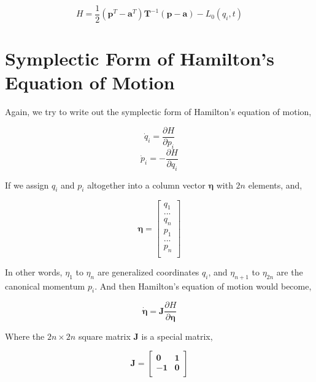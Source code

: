 \documentclass[12pt]{article}
\numberwithin{equation}{section}
\begin{document}
\begin{center}
    \[ H = \frac{1}{2}(\mathbf{p}^T - \mathbf{a}^T) \mathbf{T}^{-1} (\mathbf{p} - \mathbf{a}) - L_0(q_i, t) \]
\end{center}

\section{Symplectic Form of Hamilton's Equation of Motion}

Again, we try to write out the symplectic form of Hamilton's equation of motion,

\begin{center}
    \[ \dot{q}_i = \frac{\partial H}{\partial p_i} \]
    \[ \dot{p}_i = -\frac{\partial H}{\partial q_i}\]
\end{center}

If we assign $q_i$ and $p_i$ altogether into a column vector $\pmb{\eta}$ with $2n$ elements, and,

\begin{center}
    \[ \pmb{\eta} = \begin{bmatrix}
        q_1\\
        ...\\
        q_n\\
        p_1\\
        ...\\
        p_n\\
    \end{bmatrix}\]
\end{center}

In other words, $\eta_1$ to $\eta_n$ are generalized coordinates $q_i$, and $\eta_{n+1}$ to $\eta_{2n}$ are the canonical momentum $p_{i}$. And then Hamilton's equation of motion would become,

\begin{center}
    \[ \dot{\pmb{\eta}} = \pmb{J}\frac{\partial H}{\partial \pmb{\eta}}\]
\end{center}

Where the $2n \times 2n$ square matrix $\pmb{J}$ is a special matrix,

\begin{center}
    \[ \pmb{J} = \begin{bmatrix}
        \pmb{0} & \pmb{1}\\
        \pmb{-1} & \pmb{0}\\
    \end{bmatrix}\]
\end{center}
\end{document}
